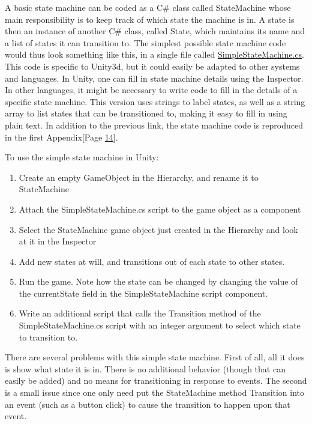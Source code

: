 A basic state machine can be coded as a C\# class called StateMachine
whose main responsibility is to keep track of which state the machine is
in. A state is then an instance of another C\# class, called State,
which maintains its name and a list of states it can transition to. The
simplest possible state machine code would thus look something like
this, in a single file called
\href{https://gist.github.com/tdvance/15aee1cfccecc49c2ce51c038b064120}{SimpleStateMachine.cs}.
This code is specific to Unity3d, but it could easily be adapted to
other systems and languages. In Unity, one can fill in state machine
details using the Inspector. In other languages, it might be necessary
to write code to fill in the details of a specific state machine. This
version uses strings to label states, as well as a string array to list
states that can be transitioned to, making it easy to fill in using
plain text. In addition to the previous link, the state machine code is
reproduced in the first Appendix{[}Page
\protect\hyperlink{anchor-13}{14}{]}.

To use the simple state machine in Unity:

\begin{enumerate}
\def\labelenumi{\arabic{enumi}.}
\tightlist
\item
  Create an empty GameObject in the Hierarchy, and rename it to
  StateMachine
\item
  Attach the SimpleStateMachine.cs script to the game object as a
  component
\item
  Select the StateMachine game object just created in the Hierarchy and
  look at it in the Inspector
\item
  Add new states at will, and transitions out of each state to other
  states.
\item
  Run the game. Note how the state can be changed by changing the value
  of the currentState field in the SimpleStateMachine script component.
\item
  Write an additional script that calls the Transition method of the
  SimpleStateMachine.cs script with an integer argument to select which
  state to transition to.
\end{enumerate}

There are several problems with this simple state machine. First of all,
all it does is show what state it is in. There is no additional behavior
(though that can easily be added) and no means for transitioning in
response to events. The second is a small issue since one only need put
the StateMachine method Transition into an event (such as a button
click) to cause the transition to happen upon that event.

